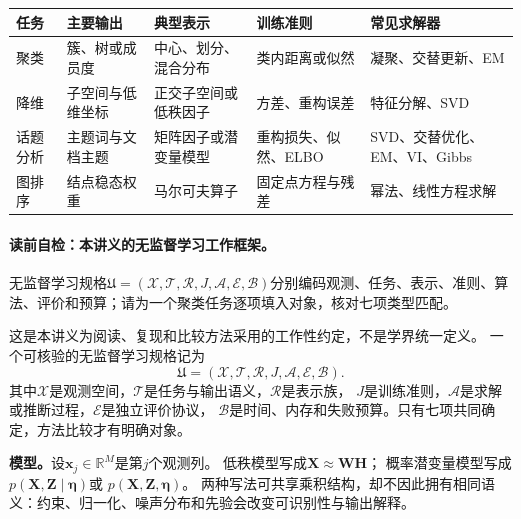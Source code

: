 \begin{center}
\small
\begin{tabularx}{\textwidth}{@{}>{\raggedright\arraybackslash}p{}>{\raggedright\arraybackslash}p{}>{\raggedright\arraybackslash}p{}>{\raggedright\arraybackslash}X>{\raggedright\arraybackslash}p{}@{}}
\toprule
任务 & 主要输出 & 典型表示 & 训练准则 & 常见求解器 \\
\midrule
聚类 & 簇、树或成员度 & 中心、划分、混合分布 & 类内距离或似然 & 凝聚、交替更新、EM \\
降维 & 子空间与低维坐标 & 正交子空间或低秩因子 & 方差、重构误差 & 特征分解、SVD \\
话题分析 & 主题词与文档主题 & 矩阵因子或潜变量模型 & 重构损失、似然、ELBO & SVD、交替优化、EM、VI、Gibbs \\
图排序 & 结点稳态权重 & 马尔可夫算子 & 固定点方程与残差 & 幂法、线性方程求解 \\
\bottomrule
\end{tabularx}
\end{center}

\begingroup
{}
\setlength{\parskip}{0.10\baselineskip}

\label{struct:V5-C08-CH07}
\paragraph{读前自检：本讲义的无监督学习工作框架。}无监督学习规格$\mathfrak U=(\mathcal X,\mathcal T,\mathcal R,J,\mathcal A,\mathcal E,\mathcal B)$分别编码观测、任务、表示、准则、算法、评价和预算；请为一个聚类任务逐项填入对象，核对七项类型匹配。\par

\begin{definition}[本讲义的无监督学习工作框架]\label{def:V5-C08-specification}
这是本讲义为阅读、复现和比较方法采用的工作性约定，不是学界统一定义。
一个可核验的无监督学习规格记为
\[
\mathfrak U=(\mathcal X,\mathcal T,\mathcal R,J,\mathcal A,\mathcal E,\mathcal B).
\]
其中$\mathcal X$是观测空间，$\mathcal T$是任务与输出语义，$\mathcal R$是表示族，
$J$是训练准则，$\mathcal A$是求解或推断过程，$\mathcal E$是独立评价协议，
$\mathcal B$是时间、内存和失败预算。只有七项共同确定，方法比较才有明确对象。
\end{definition}

\label{struct:V5-C08-CH08}
\textbf{模型。}设$\boldsymbol x_j\in\mathbb R^M$是第$j$个观测列。
低秩模型写成$\boldsymbol X\approx\boldsymbol W\boldsymbol H$；
概率潜变量模型写成
$p(\boldsymbol X,\boldsymbol Z\mid\boldsymbol\eta)$或
$p(\boldsymbol X,\boldsymbol Z,\boldsymbol\eta)$。
两种写法可共享乘积结构，却不因此拥有相同语义：约束、归一化、噪声分布和先验会改变可识别性与输出解释。

